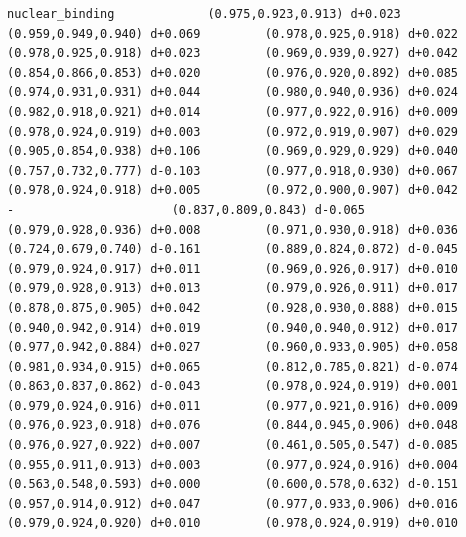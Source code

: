 \documentclass[11pt, letterpaper, openany]{book}
\begin{document}
\begin{empiricalbox}
\begin{lstlisting}[style=terminal]
nuclear_binding             (0.975,0.923,0.913) d+0.023         (0.959,0.949,0.940) d+0.069         (0.978,0.925,0.918) d+0.022         (0.978,0.925,0.918) d+0.023         (0.969,0.939,0.927) d+0.042         (0.854,0.866,0.853) d+0.020         (0.976,0.920,0.892) d+0.085         (0.974,0.931,0.931) d+0.044         (0.980,0.940,0.936) d+0.024         (0.982,0.918,0.921) d+0.014         (0.977,0.922,0.916) d+0.009         (0.978,0.924,0.919) d+0.003         (0.972,0.919,0.907) d+0.029         (0.905,0.854,0.938) d+0.106         (0.969,0.929,0.929) d+0.040         (0.757,0.732,0.777) d-0.103         (0.977,0.918,0.930) d+0.067         (0.978,0.924,0.918) d+0.005         (0.972,0.900,0.907) d+0.042                      -                      (0.837,0.809,0.843) d-0.065         (0.979,0.928,0.936) d+0.008         (0.971,0.930,0.918) d+0.036         (0.724,0.679,0.740) d-0.161         (0.889,0.824,0.872) d-0.045         (0.979,0.924,0.917) d+0.011         (0.969,0.926,0.917) d+0.010         (0.979,0.928,0.913) d+0.013         (0.979,0.926,0.911) d+0.017         (0.878,0.875,0.905) d+0.042         (0.928,0.930,0.888) d+0.015         (0.940,0.942,0.914) d+0.019         (0.940,0.940,0.912) d+0.017         (0.977,0.942,0.884) d+0.027         (0.960,0.933,0.905) d+0.058         (0.981,0.934,0.915) d+0.065         (0.812,0.785,0.821) d-0.074         (0.863,0.837,0.862) d-0.043         (0.978,0.924,0.919) d+0.001         (0.979,0.924,0.916) d+0.011         (0.977,0.921,0.916) d+0.009         (0.976,0.923,0.918) d+0.076         (0.844,0.945,0.906) d+0.048         (0.976,0.927,0.922) d+0.007         (0.461,0.505,0.547) d-0.085         (0.955,0.911,0.913) d+0.003         (0.977,0.924,0.916) d+0.004         (0.563,0.548,0.593) d+0.000         (0.600,0.578,0.632) d-0.151         (0.957,0.914,0.912) d+0.047         (0.977,0.933,0.906) d+0.016         (0.979,0.924,0.920) d+0.010         (0.978,0.924,0.919) d+0.010     

\end{lstlisting}
\end{empiricalbox}
\end{document}
